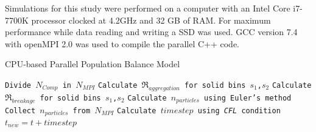 \documentclass[preprint,10pt,authoryear,review]{elsarticle}
\begin{document}
\begin{linenumbers}
Simulations for this study were performed on a computer with an Intel Core i7-7700K 
processor clocked at 4.2GHz and 32 GB of RAM. For maximum performance while 
data reading and writing a SSD was used. GCC version 7.4 with openMPI 2.0 
was used to compile the parallel C++ code.

\begin{algorithm}
     \scriptsize
     \caption{CPU-based Parallel Population Balance Model}
     \label{alg:CPUparallelPBM}
     \begin{algorithmic}[1]
     \State \texttt{Divide $N_{Comp}$ in $N_{MPI}$}
     \State \texttt{Calculate $\Re_{aggregation}$ for solid bins $s_1$,$s_2$}
     \State \texttt{Calculate $\Re_{breakage}$ for solid bins $s_1$,$s_2$}
     \State \texttt{Calculate $n_{particles}$ using Euler's method}
     \EndFor
     \State \texttt{Collect $n_{particles}$ from $N_{MPI}$}
     \State \texttt{Calculate $timestep$ using \textit{CFL} condition}
     \State \texttt{$t_{new} = t + timestep$ }
     \EndWhile
     \EndProcedure
     \end{algorithmic}
 \end{algorithm}   





\end{linenumbers}
\end{document}
